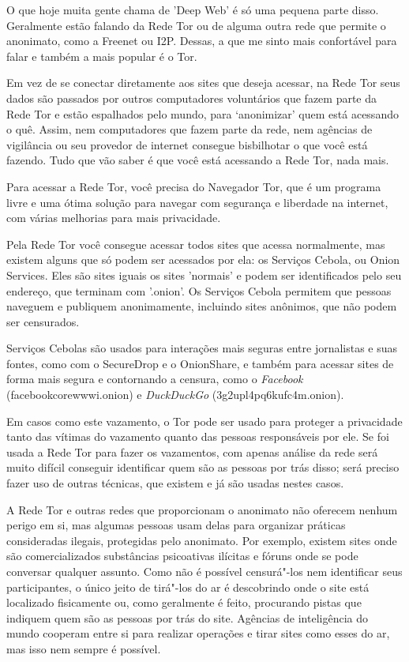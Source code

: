 O que hoje muita gente chama de 'Deep Web' é só uma pequena parte disso.
Geralmente estão falando da Rede Tor ou de alguma outra rede que permite
o anonimato, como a Freenet ou I2P. Dessas, a que me sinto mais
confortável para falar e também a mais popular é o Tor.

Em vez de se conectar diretamente aos sites que deseja acessar, na
Rede Tor seus dados são passados por outros computadores voluntários que
fazem parte da Rede Tor e estão espalhados pelo mundo, para `anonimizar'
quem está acessando o quê. Assim, nem computadores que fazem parte da
rede, nem agências de vigilância ou seu provedor de internet consegue
bisbilhotar o que você está fazendo. Tudo que vão saber é que você está
acessando a Rede Tor, nada mais.

Para acessar a Rede Tor, você precisa do
Navegador Tor, que é um programa
livre e uma ótima solução para navegar com segurança e liberdade na
internet, com várias melhorias para mais privacidade.

Pela Rede Tor você consegue acessar todos sites que acessa normalmente,
mas existem alguns que só podem ser acessados por ela: os Serviços
Cebola, ou Onion Services. Eles são sites iguais os sites 'normais' e
podem ser identificados pelo seu endereço, que terminam com '.onion'. Os
Serviços Cebola permitem que pessoas naveguem e publiquem anonimamente,
incluindo sites anônimos, que não podem ser censurados.

Serviços Cebolas são usados para interações mais seguras entre
jornalistas e suas fontes, como com o
SecureDrop e o
OnionShare, e também para acessar
sites de forma mais segura e contornando a censura, como o
\emph{Facebook} (facebookcorewwwi.onion) e \emph{DuckDuckGo}
(3g2upl4pq6kufc4m.onion).

Em casos como este vazamento, o Tor pode ser usado para proteger a
privacidade tanto das vítimas do vazamento quanto das pessoas
responsáveis por ele. Se foi usada a Rede Tor para fazer os vazamentos,
com apenas análise da rede será muito difícil conseguir identificar quem
são as pessoas por trás disso; será preciso fazer uso de outras
técnicas, que existem e já são usadas nestes casos.

A Rede Tor e outras redes que proporcionam o anonimato não oferecem
nenhum perigo em si, mas algumas pessoas usam delas para organizar
práticas consideradas ilegais, protegidas pelo anonimato. Por exemplo,
existem sites onde são comercializados substâncias psicoativas ilícitas
e fóruns onde se pode conversar qualquer assunto. Como não é possível
censurá"-los nem identificar seus participantes, o único jeito de
tirá"-los do ar é descobrindo onde o site está localizado fisicamente ou,
como geralmente é feito, procurando pistas que indiquem quem são as
pessoas por trás do site. Agências de inteligência do mundo cooperam
entre si para realizar operações e tirar sites como esses do ar, mas
isso nem sempre é possível.

